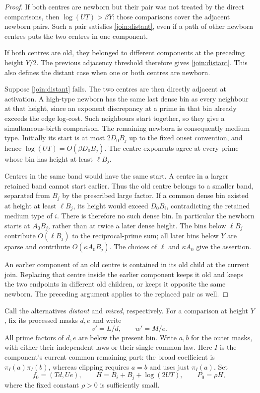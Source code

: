 \begin{proof}
If both centres are newborn but their pair was not treated by the
direct comparisons, then $\log(UT)>\beta Y$: those comparisons cover
the adjacent newborn pairs. Such a pair satisfies
\eqref{join:distant}, even if a path of other newborn centres puts
the two centres in one component.

If both centres are old, they belonged to different components at the
preceding height $Y/2$. The previous adjacency threshold therefore gives
\eqref{join:distant}. This also defines the distant case when one or both
centres are newborn.

Suppose \eqref{join:distant} fails. The two centres are then directly
adjacent at activation. A high-type newborn has the same last dense bin
as every neighbour at that height, since an exponent discrepancy at a
prime in that bin already exceeds the edge log-cost. Such neighbours
start together, so they give a simultaneous-birth comparison. The
remaining newborn is consequently medium type. Initially its start is
at most $2D_0 B_j$ up to the fixed onset convention, and hence
$\log(UT)=O(\beta D_0B_j)$. The centre exponents agree at every prime
whose bin has height at least $\ell B_j$.

Centres in the same band would have the same start. A centre in a larger
retained band cannot start earlier. Thus the old centre belongs to a
smaller band, separated from $B_j$ by the prescribed large factor. If a
common dense bin existed at height at least $\ell B_j$, its height would
exceed $D_0 B_i$, contradicting the retained medium type of $i$. There is
therefore no such dense bin. In particular the newborn starts at
$A_0B_j$, rather than at twice a later dense height. The bins below
$\ell B_j$ contribute $O(\ell B_j)$ to the reciprocal-prime sum; all
later bins below $Y$ are sparse and contribute $O(\kappa A_0 B_j)$.
The choices of $\ell$ and $\kappa A_0$ give the assertion.

An earlier component of an old centre is contained in its old child at
the current join. Replacing that centre inside the earlier component
keeps it old and keeps the two endpoints in different old children, or
keeps it opposite the same newborn. The preceding argument applies to
the replaced pair as well.
\end{proof}

Call the alternatives \emph{distant} and \emph{mixed}, respectively.
For a comparison at height $Y$, fix its processed masks $d,e$ and write
\[
 v'=L/d,\qquad w'=M/e.
\]
All prime factors of $d,e$ are below the present bin. Write $a,b$ for
the outer masks, with either their independent laws or their single
common law. Here $I$ is the component's current common remaining part:
the broad coefficient is $\pi_I(a)\pi_I(b)$, whereas clipping requires
$a=b$ and uses just $\pi_I(a)$. Set
\[
 f_0=(Td,Ue),\qquad
 H=B_i+B_j+\log(2UT),\qquad P_0=\rho H,
\]
where the fixed constant $\rho>0$ is sufficiently small.

